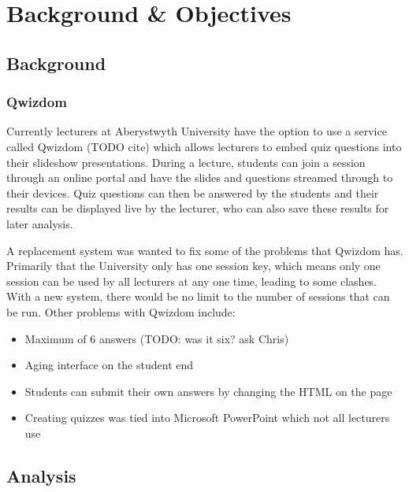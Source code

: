 \chapter{Background \& Objectives}
\section{Background} 
\subsection{Qwizdom}
Currently lecturers at Aberystwyth University have the option to use a service called Qwizdom (TODO cite) which allows lecturers to embed quiz questions into their slideshow presentations. During a lecture, students can join a session through an online portal and have the slides and questions streamed through to their devices. Quiz questions can then be answered by the students and their results can be displayed live by the lecturer, who can also save these results for later analysis.

A replacement system was wanted to fix some of the problems that Qwizdom has. Primarily that the University only has one session key, which means only one session can be used by all lecturers at any one time, leading to some clashes. With a new system, there would be no limit to the number of sessions that can be run. Other problems with Qwizdom include:
\begin{itemize}
	\item Maximum of 6 answers (TODO: was it six? ask Chris)
	\item Aging interface on the student end
	\item Students can submit their own answers by changing the HTML on the page
	\item Creating quizzes was tied into Microsoft PowerPoint which not all lecturers use
\end{itemize}

\section{Analysis}
